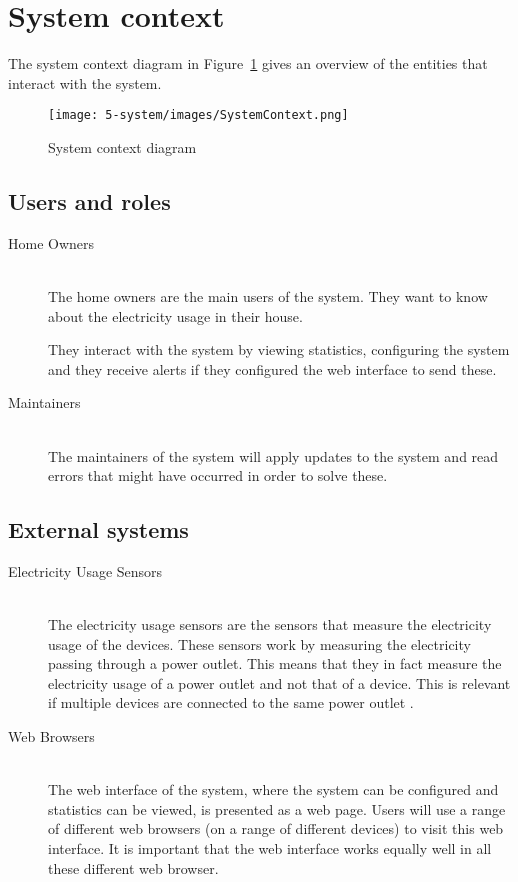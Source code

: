 \section{System context}
\label{sec:system-context}

The system context diagram in Figure~\ref{fig:system-context-diagram} gives an overview of the entities that interact with the system.

\begin{figure}[H]
	\centering
	\texttt{[image: 5-system/images/SystemContext.png]}
	\caption{System context diagram}
	\label{fig:system-context-diagram}
\end{figure}

\subsection{Users and roles}
\begin{description}

	\item[Home Owners] ~\\ The home owners are the main users of the system. They want to know about the electricity usage in their house. 
	
	They interact with the system by viewing statistics, configuring the system and they receive alerts if they configured the web interface to send these. 
	
	\item[Maintainers] ~\\ The maintainers of the system will apply updates to the system and read errors that might have occurred in order to solve these.
	
\end{description}

\subsection{External systems}
\begin{description}

	\item[Electricity Usage Sensors] ~\\ The electricity usage sensors are the sensors that measure the electricity usage of the devices. These sensors work by measuring the electricity passing through a power outlet. This means that they in fact measure the electricity usage of a power outlet and not that of a device. This is relevant if multiple devices are connected to the same power outlet .
	
	\item[Web Browsers] ~\\ The web interface of the system, where the system can be configured and statistics can be viewed, is presented as a web page. Users will use a range of different web browsers (on a range of different devices) to visit this web interface. It is important that the web interface works equally well in all these different web browser.
	
\end{description}
